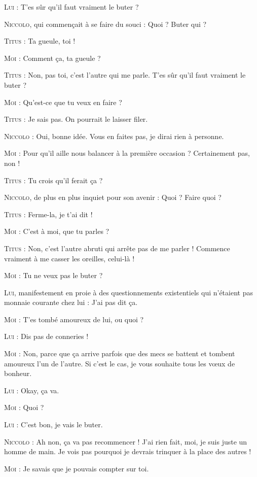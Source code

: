 \begin{dialogue}
\textsc{Lui} : T’es sûr qu’il faut vraiment le buter ?

\textsc{Niccolo}, qui commençait à se faire du souci : Quoi ? Buter qui ?

\textsc{Titus} : Ta gueule, toi !

\textsc{Moi} : Comment ça, ta gueule ?

\textsc{Titus} : Non, pas toi, c’est l’autre qui me parle. T’es sûr qu’il faut vraiment le buter ?

\textsc{Moi} : Qu’est-ce que tu veux en faire ?

\textsc{Titus} : Je sais pas. On pourrait le laisser filer.

\textsc{Niccolo} : Oui, bonne idée. Vous en faites pas, je dirai rien à personne.

\textsc{Moi} : Pour qu’il aille nous balancer à la première occasion ? Certainement pas, non !

\textsc{Titus} : Tu crois qu’il ferait ça ?

\textsc{Niccolo}, de plus en plus inquiet pour son avenir : Quoi ? Faire quoi ?

\textsc{Titus} : Ferme-la, je t’ai dit !

\textsc{Moi} : C’est à moi, que tu parles ?

\textsc{Titus} : Non, c’est l’autre abruti qui arrête pas de me parler ! Commence vraiment à me casser les oreilles, celui-là !

\textsc{Moi} : Tu ne veux pas le buter ?

\textsc{Lui}, manifestement en proie à des questionnements existentiels qui n’étaient pas monnaie courante chez lui : J’ai pas dit ça.

\textsc{Moi} : T’es tombé amoureux de lui, ou quoi ?

\textsc{Lui} : Dis pas de conneries !

\textsc{Moi} : Non, parce que ça arrive parfois que des mecs se battent et tombent amoureux l’un de l’autre. Si c’est le cas, je vous souhaite tous les vœux de bonheur.

\textsc{Lui} : Okay, ça va.

\textsc{Moi} : Quoi ?

\textsc{Lui} : C’est bon, je vais le buter.

\textsc{Niccolo} : Ah non, ça va pas recommencer ! J’ai rien fait, moi, je suis juste un homme de main. Je vois pas pourquoi je devrais trinquer à la place des autres !

\textsc{Moi} : Je savais que je pouvais compter sur toi.


\end{dialogue}
